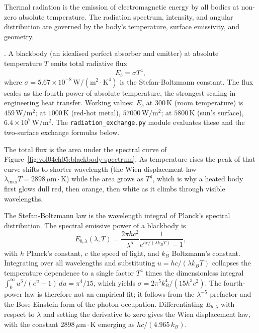 Thermal radiation is the emission of electromagnetic energy by all
bodies at non-zero absolute temperature. The radiation spectrum,
intensity, and angular distribution are governed by the body's
temperature, surface emissivity, and geometry.

. A blackbody (an idealised perfect
absorber and emitter) at absolute temperature $T$ emits total
radiative flux
\[
E_b = \sigma T^4,
\]
where $\sigma = 5.67 \times 10^{-8}\,\text{W}/(\text{m}^2\cdot\si{
\kelvin}^4)$ is the Stefan-Boltzmann constant. The flux scales as the
fourth power of absolute temperature, the strongest scaling in
engineering heat transfer. Working values: $E_b$ at $300\,\si{\kelvin}$
(room temperature) is $459\,\text{W}/\text{m}^2$; at $1000\,\si{\kelvin}$
(red-hot metal), $57000\,\text{W}/\text{m}^2$; at $5800\,\si{\kelvin}$
(sun's surface), $6.4 \times 10^7\,\text{W}/\text{m}^2$. The
\texttt{radiation\_exchange.py} module evaluates these and the
two-surface exchange formulas below.



The total flux is the area under the spectral curve of
Figure~\ref{fig:vol04ch05:blackbody-spectrum}. As temperature rises the
peak of that curve shifts to shorter wavelength (the Wien displacement
law $\lambda_{\max} T = 2898\,\mu\text{m}\cdot\si{\kelvin}$) while the
area grows as $T^4$, which is why a heated body first glows dull red,
then orange, then white as it climbs through visible wavelengths.

\begin{mastery}
The Stefan-Boltzmann law is the wavelength integral of Planck's
spectral distribution. The spectral emissive power of a blackbody is
\[
E_{b,\lambda}(\lambda, T) = \frac{2\pi h c^2}{\lambda^5}
\frac{1}{e^{hc/(\lambda k_B T)} - 1},
\]
with $h$ Planck's constant, $c$ the speed of light, and $k_B$
Boltzmann's constant. Integrating over all wavelengths and substituting
$u = hc/(\lambda k_B T)$ collapses the temperature dependence to a
single factor $T^4$ times the dimensionless integral
$\int_0^\infty u^3/(e^u - 1)\,du = \pi^4/15$, which yields
$\sigma = 2\pi^5 k_B^4/(15 h^3 c^2)$. The fourth-power law is therefore
not an empirical fit; it follows from the $\lambda^{-5}$ prefactor and
the Bose-Einstein form of the photon occupation. Differentiating
$E_{b,\lambda}$ with respect to $\lambda$ and setting the derivative to
zero gives the Wien displacement law, with the constant
$2898\,\mu\text{m}\cdot\si{\kelvin}$ emerging as $hc/(4.965\,k_B)$.
\end{mastery}

